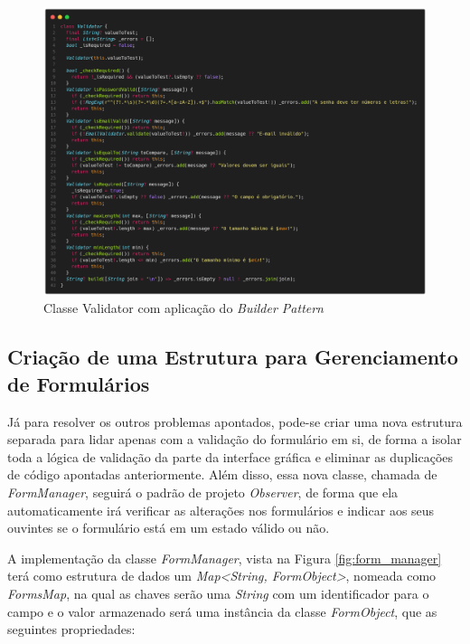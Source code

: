 \documentclass[12pt, %
openright, 
oneside, %
a4paper,    %
brazil]{facom-ufu-abntex2}
\begin{document}
\begin{figure}[ht]
    \centering
    \includegraphics[width=1\textwidth, trim={0 30 0 100}, clip]{figures/forms/form_validator.png}
    \caption{Classe Validator com aplicação do \textit{Builder Pattern}}
    \label{fig:form_validator}
\end{figure}

\subsection{Criação de uma Estrutura para Gerenciamento de Formulários}

Já para resolver os outros problemas apontados, pode-se criar uma nova estrutura separada para lidar apenas com a validação do formulário em si, de forma a isolar toda a lógica de validação da parte da interface gráfica e eliminar as duplicações de código apontadas anteriormente. Além disso, essa nova classe, chamada de \textit{FormManager}, seguirá o padrão de projeto \textit{Observer}, de forma que ela automaticamente irá verificar as alterações nos formulários e indicar aos seus ouvintes se o formulário está em um estado válido ou não.

A implementação da classe \textit{FormManager}, vista na Figura \ref{fig:form_manager} terá como estrutura de dados um \textit{Map<String, FormObject>}, nomeada como \textit{FormsMap}, na qual as chaves serão uma \textit{String} com um identificador para o campo e o valor armazenado será uma instância da classe \textit{FormObject}, que as seguintes propriedades:
\end{document}
